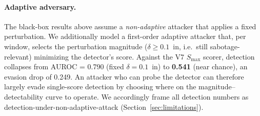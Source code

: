 \paragraph{Adaptive adversary.}
The black-box results above assume a \emph{non-adaptive} attacker that applies a fixed perturbation.
We additionally model a first-order adaptive attacker that, per window, selects the perturbation magnitude ($\delta \geq 0.1$~in, i.e.\ still sabotage-relevant) minimizing the detector's score.
Against the V7 $S_{\max}$ scorer, detection collapses from AUROC = 0.790 (fixed $\delta = 0.1$~in) to \textbf{0.541} (near chance), an evasion drop of 0.249.
An attacker who can probe the detector can therefore largely evade single-score detection by choosing where on the magnitude--detectability curve to operate.
We accordingly frame all detection numbers as detection-under-non-adaptive-attack (Section~\ref{sec:limitations}).
